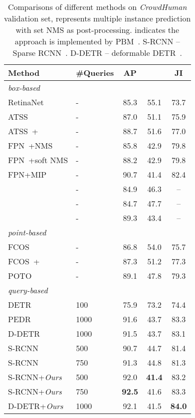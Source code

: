 \documentclass[final]{cvpr}
\begin{document}
\begin{table}[ht]
	\centering
	\begin{tabular}{llccc}
		\toprule
		Method & \#Queries & AP &   & JI \\
		\hline
		\hline
		\textit{box-based} \\
		RetinaNet~\cite{lin2020focal} & - & 85.3 & 55.1 & 73.7 \\
		ATSS~\cite{2020atss} & - & 87.0 & 51.1 & 75.9 \\
        ATSS~\cite{2020atss}+~\cite{chu2020detection} & - & 88.7 & 51.6 & 77.0 \\
		FPN~\cite{lin2017feature}+NMS & - & 85.8 & 42.9 & 79.8 \\
		FPN~\cite{lin2017feature}+soft NMS & - & 88.2 & 42.9 & 79.8 \\
		FPN+MIP~\cite{chu2020detection} & - & 90.7 & 41.4 & 82.4 \\
		\hline
	     & - & 84.9 & 46.3 & -- \\
	    ~\cite{liu2019adaptive} & - & 84.7 & 47.7 & -- \\
	    ~\cite{huang2020nms} & - & 89.3 & 43.4 & -- \\
		\hline
		\hline
		\textit{point-based} \\
		FCOS~\cite{tian2021fcos} & - & 86.8 & 54.0 & 75.7 \\
		FCOS~\cite{tian2021fcos}+~\cite{chu2020detection} & - & 87.3 & 51.2 & 77.3 \\
		POTO~\cite{wang2020end} & - & 89.1 & 47.8 & 79.3 \\
		\hline
		\hline
		\textit{query-based} \\
		DETR~\cite{carion2020end} & 100 & 75.9 & 73.2 & 74.4 \\
		PEDR \cite{lin2020detr} & 1000 & 91.6 & 43.7 & 83.3 \\
		D-DETR \cite{zhu2021deformable} & 1000 & 91.5 & 43.7 & 83.1 \\
		S-RCNN~\cite{sun2020sparse} & 500 & 90.7 & 44.7 & 81.4 \\
		S-RCNN~\cite{sun2020sparse} & 750 & 91.3 & 44.8 & 81.3 \\
		\hline
		S-RCNN+\emph{Ours} & 500 & 92.0 & \textbf{41.4} & 83.2 \\
		S-RCNN+\emph{Ours} & 750 & \textbf{92.5} & 41.6 & 83.3 \\
		D-DETR+\emph{Ours} & 1000 & 92.1 & 41.5 & \textbf{84.0} \\
		\bottomrule
	\end{tabular}
	\caption{Comparisons of different methods on \emph{CrowdHuman} validation set,  represents multiple instance prediction with set NMS as post-processing.  indicates the approach is implemented by PBM~\cite{huang2020nms}. S-RCNN -- Sparse RCNN~\cite{sun2020sparse}. D-DETR -- deformable DETR~\cite{zhu2021deformable}.}
	\label{tbl:sota}
	\vspace{-1pc}
\end{table}
\end{document}
